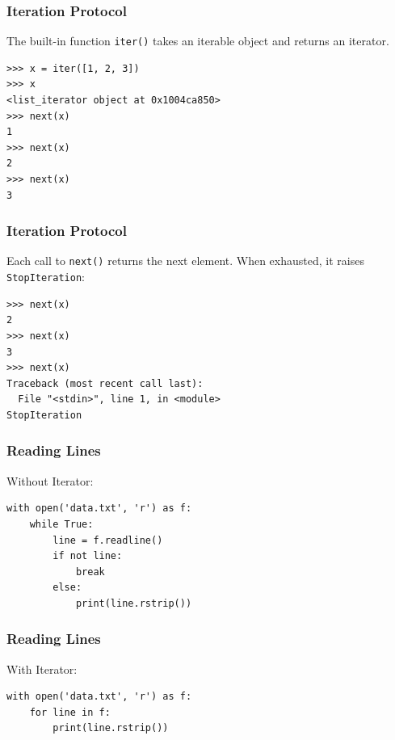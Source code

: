 \begin{frame}[fragile]\frametitle{Iteration Protocol}
The built-in function \lstinline|iter()| takes an iterable object and returns an iterator.
	\begin{lstlisting}
>>> x = iter([1, 2, 3])
>>> x
<list_iterator object at 0x1004ca850>
>>> next(x)
1
>>> next(x)
2
>>> next(x)
3
\end{lstlisting}
\end{frame}

\begin{frame}[fragile]\frametitle{Iteration Protocol}

Each call to \lstinline|next()| returns the next element. When exhausted, it raises
\lstinline|StopIteration|:
\begin{lstlisting}
>>> next(x)
2
>>> next(x)
3
>>> next(x)
Traceback (most recent call last):
  File "<stdin>", line 1, in <module>
StopIteration
\end{lstlisting}
\end{frame}


\begin{frame}[fragile]\frametitle{Reading Lines}
Without Iterator:
\begin{lstlisting}
with open('data.txt', 'r') as f:
    while True:
        line = f.readline()
        if not line: 
            break
        else: 
            print(line.rstrip())
\end{lstlisting}

\end{frame}

\begin{frame}[fragile]\frametitle{Reading Lines}
With Iterator:
\begin{lstlisting}
with open('data.txt', 'r') as f:
    for line in f:
        print(line.rstrip())
\end{lstlisting}

\end{frame}


